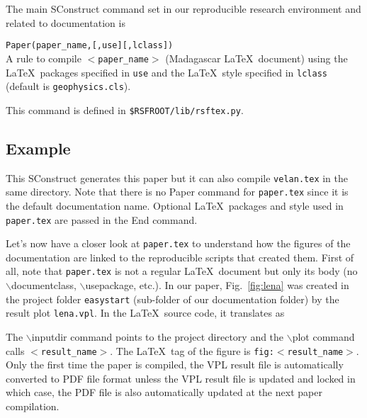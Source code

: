 The main SConstruct command set in our reproducible research
environment and related to documentation is

\noindent\texttt{Paper(paper\_name,[,use][,lclass])}\\
\indent A rule to compile \texttt{$<$paper\_name$>$} (Madagascar
\LaTeX\ document) using the \LaTeX\ packages specified in \texttt{use}
and the \LaTeX\ style specified in \texttt{lclass} (default is
\texttt{geophysics.cls}).

This command is defined in \texttt{\$RSFROOT/lib/rsftex.py}.

\subsection{Example}



This SConstruct generates this paper but it can also compile
\texttt{velan.tex} in the same directory. Note that there is no Paper
command for \texttt{paper.tex} since it is the default documentation
name. Optional \LaTeX\ packages and style used in \texttt{paper.tex}
are passed in the End command.

Let's now have a closer look at \texttt{paper.tex} to understand how
the figures of the documentation are linked to the reproducible
scripts that created them. First of all, note that \texttt{paper.tex}
is not a regular \LaTeX\ document but only its body (no
$\backslash$documentclass, $\backslash$usepackage, etc.). In our
paper, Fig.~\ref{fig:lena} was created in the project folder
\texttt{easystart} (sub-folder of our documentation folder) by the
result plot \texttt{lena.vpl}. In the \LaTeX\ source code, it
translates as\\



The $\backslash$inputdir command points to the project directory and
the $\backslash$plot command calls \texttt{$<$result\_name$>$}. The
\LaTeX\ tag of the figure is \texttt{fig:$<$result\_name$>$}. Only the
first time the paper is compiled, the VPL result file is automatically
converted to PDF file format unless the VPL result file is updated and
locked in which case, the PDF file is also automatically updated at
the next paper compilation.

